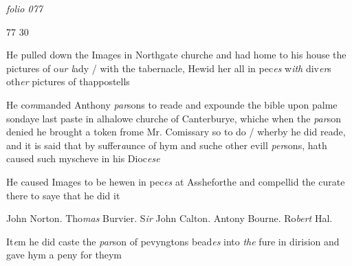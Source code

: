 \documentclass[12pt, a4paper]{book}
\begin{document}

\textit{folio 077}


\begin{flushright}{\color{Mahogany}77} 30\end{flushright}
 
 	
			
 	
		\ifthenelse{\isodd{\thepage}}
		{\reversemarginpar}
		{\normalmarginpar}
		He pulled down the Images in Northgate churche
 and had home to his house the pictures of o\textit{ur l}ady / with
 the tabernacle, Hewid her all in pec\textit{es} w\textit{ith} div\textit{er}s oth\textit{er}
 pictures of thappostells
	
		
				\marginpar[\vspace{0.5cm}{\textcolor{Gray}{n}}]{}
			
		
		\ifthenelse{\isodd{\thepage}}
		{\reversemarginpar}
		{\normalmarginpar}
		He co\textit{m}manded Anthony \textit{par}sons to reade and expounde
 the bible upon palme sondaye last paste in alhalowe
 	churche of Canterburye, whiche when the \textit{par}son denied
			he brought a token frome Mr. Comissary so to do /
 wherby he did reade, and it is said that by suffer\textit{a}unce
 of hym and suche other evill \textit{per}sons, hath caused such
 myscheve in his Dioc\textit{ese}
	

	
			
	
		\ifthenelse{\isodd{\thepage}}
		{\reversemarginpar}
		{\normalmarginpar}
		He caused Images to be hewen in pec\textit{es} at Assheforthe
 and compellid the curate there to saye that he did it

	
		\ifthenelse{\isodd{\thepage}}
		{\reversemarginpar}
		{\normalmarginpar}
		John Norton. Tho\textit{mas} Burvier. S\textit{ir} John Calton. Antony Bourne. Ro\textit{bert} Hal.
			

		\ifthenelse{\isodd{\thepage}}
		{\reversemarginpar}
		{\normalmarginpar}
		It\textit{e}m he did caste the \textit{par}son of pevyngtons bead\textit{es} into \textit{the}
 fure in dirision and gave hym a peny for theym
	
		
				\marginpar[\vspace{0.5cm}{\textcolor{Gray}{Confession}}]{}
			
\end{document}

